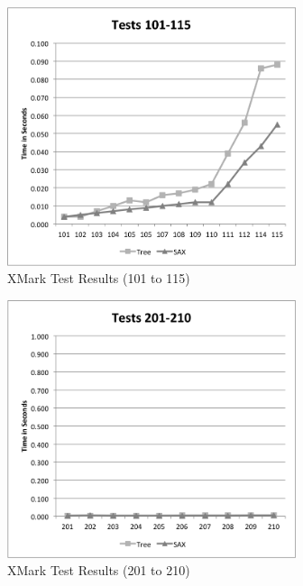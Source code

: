 \documentclass{acm_proc_article-sp}
\begin{document}
\begin{figure}[tbp]
  \centering
  \caption{XMark Test Results (101 to 115)}
	\label{tests101to115}
  \includegraphics[width=20pc]{Tests101to115.png}
\end{figure}

\begin{figure}[tbp]
  \centering
  \caption{XMark Test Results (201 to 210)}
	\label{tests201to210}
  \includegraphics[width=20pc]{Tests201to210.png}
\end{figure}
\end{document}
